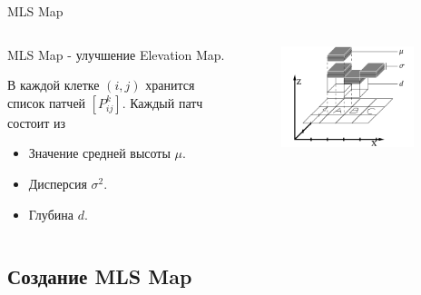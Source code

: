\documentclass[9pt]{beamer}
\begin{document}
\begin{frame}{MLS Map}
\begin{columns}
    \begin{column}{0.50\textwidth}
      MLS Map - улучшение Elevation Map.

      В каждой клетке $(i,j)$ хранится список патчей $[P_{ij}^{k}]$.
      Каждый патч состоит из
      \begin{itemize}
        \item
        { 
          Значение средней высоты $\mu$.
        }
        \item
        {
          Дисперсия $\sigma^2$.
        }
        \item
        {
          Глубина $d$.
        }
      \end{itemize}
    \end{column}
    \begin{column}{0.50\textwidth}
      \begin{figure}[h]
        \centering
        \includegraphics[width=0.9\textwidth]{mls_str.png}
      \end{figure}
    \end{column}
  \end{columns}
\end{frame}

\subsection{Создание MLS Map}
\end{document}
